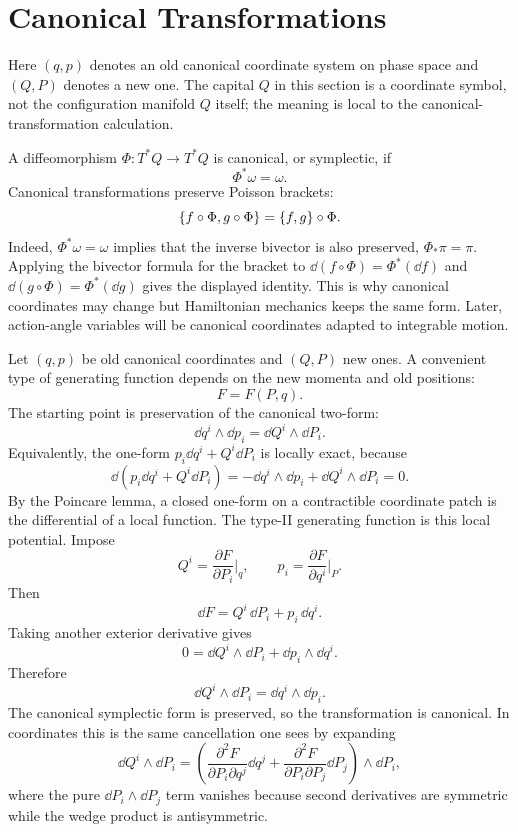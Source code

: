 \section{Canonical Transformations}
\label{sec:canonical-transformations}

Here \((q,p)\) denotes an old canonical coordinate system on phase space and
\((Q,P)\) denotes a new one.  The capital \(Q\) in this section is a coordinate
symbol, not the configuration manifold \(Q\) itself; the meaning is local to
the canonical-transformation calculation.

A diffeomorphism \(\Phi:T^*Q\to T^*Q\) is canonical, or symplectic, if
\[
  \Phi^*\omega=\omega.
\]
Canonical transformations preserve Poisson brackets:
\[
  \left\{f\circ\Phi,g\circ\Phi\right\}
  =
  \left\{f,g\right\}\circ\Phi.
\]
Indeed, \(\Phi^*\omega=\omega\) implies that the inverse bivector is also
preserved, \(\Phi_*\pi=\pi\). Applying the bivector formula for the bracket to
\(\dd(f\circ\Phi)=\Phi^*(\dd f)\) and
\(\dd(g\circ\Phi)=\Phi^*(\dd g)\) gives the displayed identity.
This is why canonical coordinates may change but Hamiltonian mechanics keeps
the same form. Later, action-angle variables will be canonical coordinates
adapted to integrable motion.

\begin{derivation}
Let \((q,p)\) be old canonical coordinates and \((Q,P)\) new ones. A convenient
type of generating function depends on the new momenta and old positions:
\[
  F=F(P,q).
\]
The starting point is preservation of the canonical two-form:
\[
  \dd q^i\wedge\dd p_i=\dd Q^i\wedge\dd P_i.
\]
Equivalently, the one-form \(p_i\dd q^i+Q^i\dd P_i\) is locally exact, because
\[
  \dd(p_i\dd q^i+Q^i\dd P_i)
  =
  -\dd q^i\wedge\dd p_i+\dd Q^i\wedge\dd P_i
  =
  0.
\]
By the Poincare lemma, a closed one-form on a contractible coordinate patch is
the differential of a local function. The type-II generating function is this
local potential.
Impose
\[
  Q^i=\frac{\partial F}{\partial P_i}\bigg|_q,
  \qquad
  p_i=\frac{\partial F}{\partial q^i}\bigg|_P.
\]
Then
\[
  \dd F=Q^i\,\dd P_i+p_i\,\dd q^i.
\]
Taking another exterior derivative gives
\[
  0=\dd Q^i\wedge\dd P_i+\dd p_i\wedge\dd q^i.
\]
Therefore
\[
  \dd Q^i\wedge\dd P_i
  =
  \dd q^i\wedge\dd p_i.
\]
The canonical symplectic form is preserved, so the transformation is canonical.
In coordinates this is the same cancellation one sees by expanding
\[
  \dd Q^i\wedge\dd P_i
  =
  \left(
    \frac{\partial^2F}{\partial P_i\partial q^j}\dd q^j
    +
    \frac{\partial^2F}{\partial P_i\partial P_j}\dd P_j
  \right)
  \wedge \dd P_i,
\]
where the pure \(\dd P_i\wedge\dd P_j\) term vanishes because second
derivatives are symmetric while the wedge product is antisymmetric.
\end{derivation}

